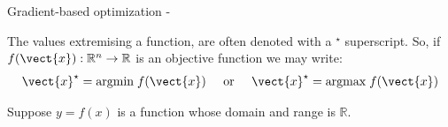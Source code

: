 
\begin{frame}[t,allowframebreaks]{Gradient-based optimization -}



    The values extremising a function, 
    are often denoted with a $^\star$ superscript.
    So, if $f(\vect{x}): \mathbb{R}^n \rightarrow \mathbb{R}$ 
    is an \gls{objective function}
    we may write:
    \begin{equation*}
        \vect{x}^{\star} = \mathrm{argmin} \; f(\vect{x})
        \;\;\;\;\; \textrm{or} \;\;\;\;\;
        \vect{x}^{\star} = \mathrm{argmax} \; f(\vect{x})
    \end{equation*}

    
    \framebreak


    Suppose $y=f(x)$ is a function whose domain and range is $\mathbb{R}$.\\
    \vspace{0.2cm}


\end{frame}

